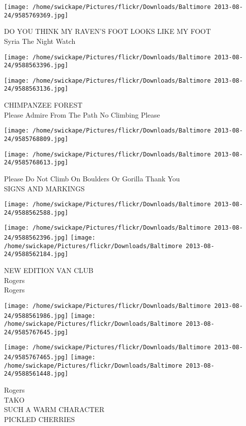\documentclass[10pt,letterpaper]{article}
\begin{document}
\vspace{0.25in}
\texttt{[image: /home/swickape/Pictures/flickr/Downloads/Baltimore 2013-08-24/9585769369.jpg]}

DO YOU THINK MY RAVEN'S FOOT LOOKS LIKE MY FOOT\\
Syria The Night Watch
\pagebreak

\texttt{[image: /home/swickape/Pictures/flickr/Downloads/Baltimore 2013-08-24/9588563396.jpg]}

\vspace{0.25in}
\texttt{[image: /home/swickape/Pictures/flickr/Downloads/Baltimore 2013-08-24/9588563136.jpg]}

CHIMPANZEE FOREST\\
Please Admire From The Path No Climbing Please
\pagebreak

\texttt{[image: /home/swickape/Pictures/flickr/Downloads/Baltimore 2013-08-24/9585768809.jpg]}

\vspace{0.25in}
\texttt{[image: /home/swickape/Pictures/flickr/Downloads/Baltimore 2013-08-24/9585768613.jpg]}

Please Do Not Climb On Boulders Or Gorilla Thank You\\
SIGNS AND MARKINGS
\pagebreak

\texttt{[image: /home/swickape/Pictures/flickr/Downloads/Baltimore 2013-08-24/9588562588.jpg]}

\vspace{0.25in}
\texttt{[image: /home/swickape/Pictures/flickr/Downloads/Baltimore 2013-08-24/9588562396.jpg]}
\texttt{[image: /home/swickape/Pictures/flickr/Downloads/Baltimore 2013-08-24/9588562184.jpg]}

NEW EDITION VAN CLUB\\
Rogers\\
Rogers
\pagebreak

\texttt{[image: /home/swickape/Pictures/flickr/Downloads/Baltimore 2013-08-24/9588561986.jpg]}
\texttt{[image: /home/swickape/Pictures/flickr/Downloads/Baltimore 2013-08-24/9585767645.jpg]}

\texttt{[image: /home/swickape/Pictures/flickr/Downloads/Baltimore 2013-08-24/9585767465.jpg]}
\texttt{[image: /home/swickape/Pictures/flickr/Downloads/Baltimore 2013-08-24/9588561448.jpg]}

Rogers\\
TAKO\\
SUCH A WARM CHARACTER\\
PICKLED CHERRIES
\pagebreak
\end{document}
